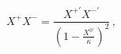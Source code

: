 \begin{equation}
X^+X^-=\frac{X^{+'}X^{-'}}{\left( 1-\frac{X^{0'}}{\kappa} \right)^2}\,,
\end{equation}

